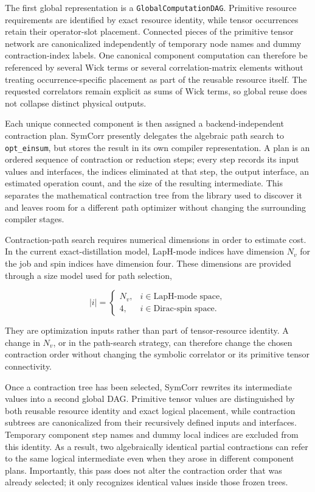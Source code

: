 \documentclass[a4paper,fleqn]{cas-dc}
\begin{document}
The first global representation is a \texttt{GlobalComputationDAG}. Primitive
resource requirements are identified by exact resource identity, while tensor
occurrences retain their operator-slot placement. Connected pieces of the
primitive tensor network are canonicalized independently of temporary node names
and dummy contraction-index labels. One canonical component computation can
therefore be referenced by several Wick terms or several correlation-matrix
elements without treating occurrence-specific placement as part of the reusable
resource itself. The requested correlators remain explicit as sums of Wick
terms, so global reuse does not collapse distinct physical outputs.

Each unique connected component is then assigned a backend-independent
contraction plan. SymCorr presently delegates the algebraic path search to
\texttt{opt\_einsum}, but stores the result in its own compiler representation.
A plan is an ordered sequence of contraction or reduction steps; every step
records its input values and interfaces, the indices eliminated at that step,
the output interface, an estimated operation count, and the size of the
resulting intermediate. This separates the mathematical contraction tree from
the library used to discover it and leaves room for a different path optimizer
without changing the surrounding compiler stages.

Contraction-path search requires numerical dimensions in order to estimate
cost. In the current exact-distillation model, LapH-mode indices have dimension
\(N_v\) for the job and spin indices have dimension four. These dimensions are
provided through a size model used for path selection,

\begin{equation}
|i|=
\begin{cases}
N_v, & i\in\text{LapH-mode space},\\
4,   & i\in\text{Dirac-spin space}.
\end{cases}
\label{eq:execution_index_size_model}
\end{equation}

They are optimization inputs rather than part of tensor-resource identity. A
change in \(N_v\), or in the path-search strategy, can therefore change the
chosen contraction order without changing the symbolic correlator or its
primitive tensor connectivity.

Once a contraction tree has been selected, SymCorr rewrites its intermediate
values into a second global DAG. Primitive tensor values are distinguished by
both reusable resource identity and exact logical placement, while contraction
subtrees are canonicalized from their recursively defined inputs and interfaces.
Temporary component step names and dummy local indices are excluded from this
identity. As a result, two algebraically identical partial contractions can
refer to the same logical intermediate even when they arose in different
component plans. Importantly, this pass does not alter the contraction order
that was already selected; it only recognizes identical values inside those
frozen trees.
\end{document}
